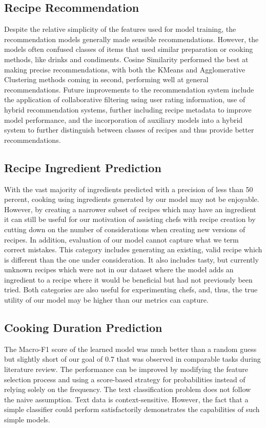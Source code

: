 \documentclass[sigconf]{acmart}
\begin{document}
\subsection{Recipe Recommendation}
Despite the relative simplicity of the features used for model training, the recommendation models generally made sensible recommendations. However, the models often confused classes of items that used similar preparation or cooking methods, like drinks and condiments. Cosine Similarity performed the best at making precise recommendations, with both the KMeans and Agglomerative Clustering methods coming in second, performing well at general recommendations. Future improvements to the recommendation system include the application of collaborative filtering using user rating information, use of hybrid recommendation systems, further including recipe metadata to improve model performance, and the incorporation of auxiliary models into a hybrid system to further distinguish between classes of recipes and thus provide better recommendations.
\subsection{Recipe Ingredient Prediction}
With the vast majority of ingredients predicted with a precision of less than 50 percent, cooking using ingredients generated by our model may not be enjoyable. However, by creating a narrower subset of recipes which may have an ingredient it can still be useful for our motivation of assisting chefs with recipe creation by cutting down on the number of considerations when creating new versions of recipes. In addition, evaluation of our model cannot capture what we term correct mistakes. This category includes generating an existing, valid recipe which is different than the one under consideration. It also includes tasty, but currently unknown recipes which were not in our dataset where the model adds an ingredient to a recipe where it would be beneficial but had not previously been tried. Both categories are also useful for experimenting chefs, and, thus, the true utility of our model may be higher than our metrics can capture.
\subsection{Cooking Duration Prediction}
The Macro-F1 score of the learned model was much better than a random guess but slightly short of our goal of 0.7 that was observed in comparable tasks during literature review. The performance can be improved by modifying the feature selection process and using a score-based strategy for probabilities instead of relying solely on the frequency.\cite{CDPImproveNaiveBayes} The text classification problem does not follow the naive assumption. Text data is context-sensitive. However, the fact that a simple classifier could perform satisfactorily demonstrates the capabilities of such simple models.
\end{document}
